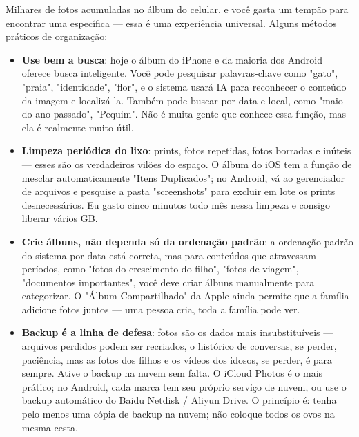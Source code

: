 
Milhares de fotos acumuladas no álbum do celular, e você gasta um tempão para encontrar uma específica — essa é uma experiência universal. Alguns métodos práticos de organização:

\begin{itemize}
  \item \textbf{Use bem a busca}: hoje o álbum do iPhone e da maioria dos Android oferece busca inteligente. Você pode pesquisar palavras-chave como "gato", "praia", "identidade", "flor", e o sistema usará IA para reconhecer o conteúdo da imagem e localizá-la. Também pode buscar por data e local, como "maio do ano passado", "Pequim". Não é muita gente que conhece essa função, mas ela é realmente muito útil.
  \item \textbf{Limpeza periódica do lixo}: prints, fotos repetidas, fotos borradas e inúteis — esses são os verdadeiros vilões do espaço. O álbum do iOS tem a função de mesclar automaticamente "Itens Duplicados"; no Android, vá ao gerenciador de arquivos e pesquise a pasta "screenshots" para excluir em lote os prints desnecessários. Eu gasto cinco minutos todo mês nessa limpeza e consigo liberar vários GB.
  \item \textbf{Crie álbuns, não dependa só da ordenação padrão}: a ordenação padrão do sistema por data está correta, mas para conteúdos que atravessam períodos, como "fotos do crescimento do filho", "fotos de viagem", "documentos importantes", você deve criar álbuns manualmente para categorizar. O "Álbum Compartilhado" da Apple ainda permite que a família adicione fotos juntos — uma pessoa cria, toda a família pode ver.
  \item \textbf{Backup é a linha de defesa}: fotos são os dados mais insubstituíveis — arquivos perdidos podem ser recriados, o histórico de conversas, se perder, paciência, mas as fotos dos filhos e os vídeos dos idosos, se perder, é para sempre. Ative o backup na nuvem sem falta. O iCloud Photos é o mais prático; no Android, cada marca tem seu próprio serviço de nuvem, ou use o backup automático do Baidu Netdisk / Aliyun Drive. O princípio é: tenha pelo menos uma cópia de backup na nuvem; não coloque todos os ovos na mesma cesta.
\end{itemize}


